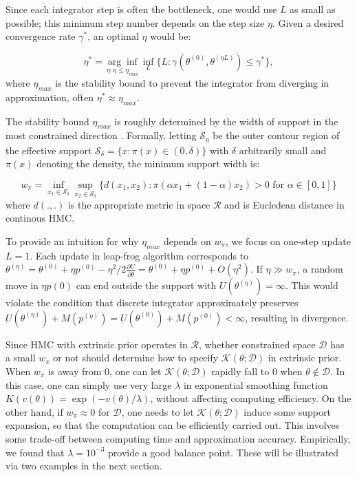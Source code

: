 \documentclass[10pt]{article}
\newcommand{\mc}[1]{\mathcal{#1}}
\DeclareMathOperator{\1}{\mathbbm{1}}
\begin{document}
Since each integrator step is often the bottleneck, one would use $L$ as small as possible; this minimum step number depends on the step size $\eta$. Given a desired convergence rate $\gamma^*$, an optimal $\eta$ would be:

$$\eta^* =  \underset{\eta: \eta \le \eta_{max}}{\arg\inf}\inf_{L}\{L: \gamma \left(\theta^{(0)}, \theta^{(\eta L)} \right) \le \gamma^*   \},$$
where $\eta_{max}$ is the stability bound to prevent the integrator from diverging in approximation, often $\eta^*\approx \eta_{max}$.

The stability bound $\eta_{max}$ is roughly determined by the width of support in the most constrained direction  \citep{neal2011mcmc}. Formally, letting $\mc S_{\eta}$ be the outer contour region of the effective support $\mc S_{\delta}=\{x: \pi(x)\in (0,\delta)\}$ with $\delta$ arbitrarily small and $\pi(x)$ denoting the density, the minimum support width is:

$$w_\pi = \underset{{x_1\in \mc S_\delta}}{\inf}\underset{x_2\in \mc S_\delta}{\sup} \{ d(x_1, x_2): \pi(\alpha x_1 + (1-\alpha)x_2)>0 \text{ for } \alpha \in [0,1]  \}$$
where $d(.,.)$ is the appropriate metric in space $\mc R$ and is Eucledean distance in continous HMC.

To provide an intuition for why $\eta_{max}$ depends on $w_\pi$, we focus on one-step update $L=1$. Each update in leap-frog algorithm corresponds to $\theta^{(\eta)}=\theta^{(0)} + \eta  p^{(0)} - \eta^2/2  \frac{\partial U}{\partial  \theta } = \theta^{(0)} + \eta  p^{(0)} + O(\eta^2)$. If $\eta \gg w_\pi$, a random move in $\eta  p(0)$ can end outside the support with $U(\theta^{(\eta)})=\infty$. This would violate the condition that discrete integrator approximately preserves $U(\theta^{(\eta)})+M(p^{(\eta)}) = U(\theta^{(0)})+M(p^{(0)})< \infty$, resulting in divergence.

Since HMC with extrinsic prior operates in $\mc R$, whether constrained space $\mc D$ has a small $w_\pi$ or not should determine
 how to specify $\mc K(\theta; \mc D)$ in extrinsic prior. When $w_\pi$ is away from $0$, one can let $\mc K(\theta; \mc D)$ rapidly fall to $0$ when $\theta\not\in \mc D$. In this case, one can simply use very large $\lambda$ in exponential smoothing function $K(v(\theta))= \exp(-v(\theta)/\lambda)$, without affecting computing efficiency. On the other hand, if $w_\pi \approx 0$ for $\mc D$, one needs to let $\mc K(\theta; \mc D)$ induce some support expansion, so that the computation can be efficiently carried out. This involves some trade-off between computing time and approximation accuracy. Empirically, we found that $\lambda= 10^{-3}$ provide a good balance point. These will be illustrated via two examples in the next section. 
\end{document}
